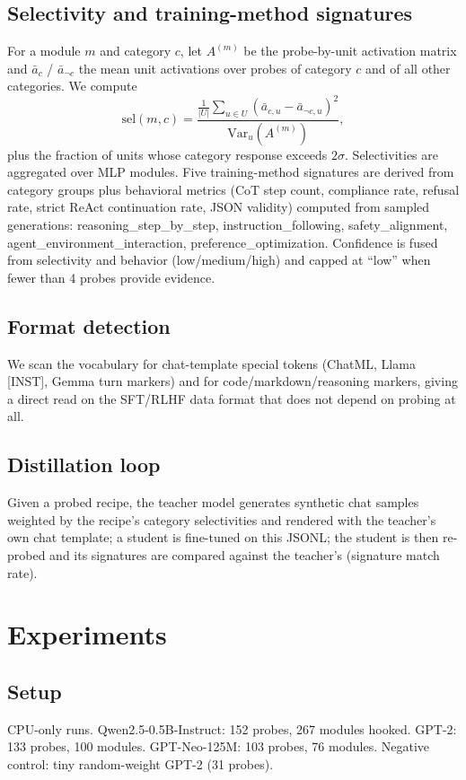 \documentclass[11pt]{article}
\begin{document}
\subsection{Selectivity and training-method signatures}
For a module $m$ and category $c$, let $A^{(m)}$ be the probe-by-unit activation matrix
and $\bar a_c$ / $\bar a_{\neg c}$ the mean unit activations over probes of category $c$
and of all other categories. We compute
$$
\mathrm{sel}(m,c)=\frac{\frac{1}{|U|}\sum_{u\in U}(\bar a_{c,u}-\bar a_{\neg c,u})^2}
                     {\mathrm{Var}_u(A^{(m)})},
$$
plus the fraction of units whose category response exceeds $2\sigma$. Selectivities are
aggregated over MLP modules. Five training-method signatures are derived from category
groups plus behavioral metrics (CoT step count, compliance rate, refusal rate, strict
ReAct continuation rate, JSON validity) computed from sampled generations:
reasoning\_step\_by\_step, instruction\_following, safety\_alignment,
agent\_environment\_interaction, preference\_optimization. Confidence is fused from
selectivity and behavior (low/medium/high) and capped at ``low'' when fewer than 4
probes provide evidence.

\subsection{Format detection}
We scan the vocabulary for chat-template special tokens (ChatML, Llama [INST], Gemma
turn markers) and for code/markdown/reasoning markers, giving a direct read on the
SFT/RLHF data format that does not depend on probing at all.

\subsection{Distillation loop}
Given a probed recipe, the teacher model generates synthetic chat samples weighted by
the recipe's category selectivities and rendered with the teacher's own chat template;
a student is fine-tuned on this JSONL; the student is then re-probed and its signatures
are compared against the teacher's (signature match rate).

\section{Experiments}
\subsection{Setup}
CPU-only runs. Qwen2.5-0.5B-Instruct: 152 probes, 267 modules hooked.
GPT-2: 133 probes, 100 modules. GPT-Neo-125M: 103 probes, 76 modules.
Negative control: tiny random-weight GPT-2 (31 probes).
\end{document}
